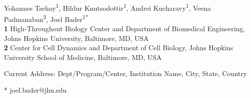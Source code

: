 \documentclass[10pt,letterpaper]{article}
\begin{document}
\vspace*{0.2in}

\begin{flushleft}
{\Large
\textbf{} %
}
\newline
\\
Yohannes Tsehay\textsuperscript{1},
Hildur Knutsodottir\textsuperscript{1},
Andrei Kucharavy\textsuperscript{1\textcurrency},
Veena Padmanaban\textsuperscript{2},
Joel Bader\textsuperscript{1*}
\\
\bigskip
\textbf{1} High-Throughout Biology Center and Department of Biomedical Engineering, Johns Hopkins University, Baltimore, MD, USA
\\
\textbf{2} Center for Cell Dynamics and Department of Cell Biology, Johns Hopkins University School of Medicine, Baltimore, MD, USA
\\
\bigskip

% 
%


\textcurrency Current Address: Dept/Program/Center, Institution Name, City, State, Country %



* joel.bader@jhu.edu

\end{flushleft}
\end{document}

